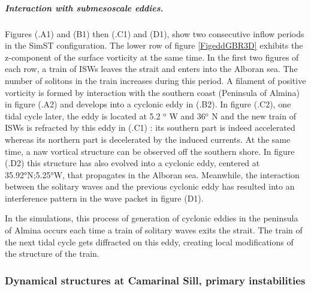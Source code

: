 \subparagraph{Interaction with submesoscale eddies.}
Figures (.A1) and (B1) then (.C1) and (D1), show two consecutive inflow periods in the SimST configuration. The lower row of figure \ref{FigeddGBR3D} exhibits the z-component of the surface vorticity at the same time. In the first two figures of each row, a train of ISWs leaves the strait and enters into the Alboran sea. The number of solitons in the train increases during this period. A filament of positive vorticity is formed by interaction with the southern coast (Peninsula of Almina) in figure (.A2) and develops into a cyclonic eddy in (.B2). In figure (.C2), one tidal cycle later, the eddy is located at 5.2 $^\text{o}$ W and 36$^\text{o}$ N and the new train of ISWs is refracted by this eddy in (.C1) : its southern part is indeed accelerated whereas its northern part is decelerated by the induced currents. At the same time, a naw vortical structure can be observed off the southern shore. In figure (.D2) this structure has also evolved into a cyclonic eddy, centered at 35.92°N;5.25°W, that propagates in the Alboran sea. Meanwhile, the interaction between the solitary waves and the previous cyclonic eddy has resulted into an interference pattern in the wave packet in figure (D1). 

In the simulations, this process of generation of cyclonic eddies in the peninsula of Almina occurs each time a train of solitary waves exits the strait. The train of the next tidal cycle gets diffracted on this eddy, creating local modifications of the structure of the train.

\subsubsection{Dynamical structures at Camarinal Sill, primary instabilities}
\label{sectionsim3D_res_insta}

